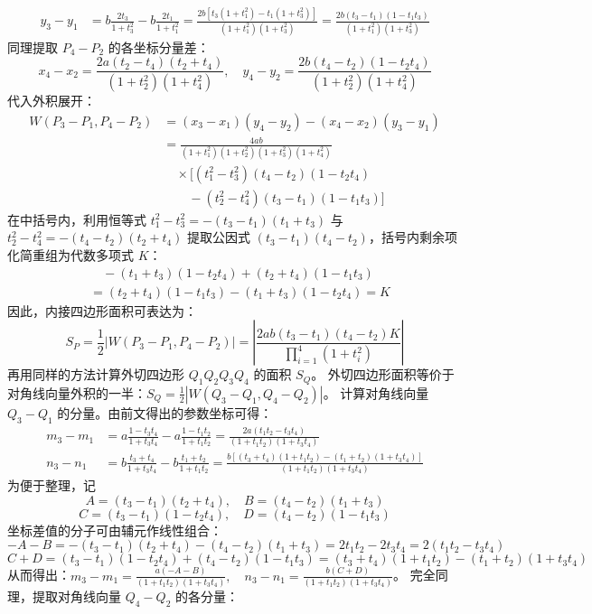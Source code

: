 \begin{solution}
\begin{align*}
y_3 - y_1 &= b\frac{2t_3}{1+t_3^2} - b\frac{2t_1}{1+t_1^2} = \frac{2b[t_3(1+t_1^2) - t_1(1+t_3^2)]}{(1+t_1^2)(1+t_3^2)} = \frac{2b(t_3-t_1)(1 - t_1 t_3)}{(1+t_1^2)(1+t_3^2)}
\end{align*}
同理提取 $P_4-P_2$ 的各坐标分量差：
\[ x_4 - x_2 = \frac{2a(t_2-t_4)(t_2+t_4)}{(1+t_2^2)(1+t_4^2)}, \quad y_4 - y_2 = \frac{2b(t_4-t_2)(1 - t_2 t_4)}{(1+t_2^2)(1+t_4^2)} \]
代入外积展开：
\begin{align*}
W(P_3-P_1, P_4-P_2) &= (x_3-x_1)(y_4-y_2) - (x_4-x_2)(y_3-y_1) \\
&= \frac{4ab}{(1+t_1^2)(1+t_2^2)(1+t_3^2)(1+t_4^2)} \\
&\quad \times \Big[ (t_1^2-t_3^2)(t_4-t_2)(1-t_2 t_4) \\
&\qquad - (t_2^2-t_4^2)(t_3-t_1)(1-t_1 t_3) \Big]
\end{align*}
在中括号内，利用恒等式 $t_1^2-t_3^2 = -(t_3-t_1)(t_1+t_3)$ 与 $t_2^2-t_4^2 = -(t_4-t_2)(t_2+t_4)$ 提取公因式 $(t_3-t_1)(t_4-t_2)$，括号内剩余项化简重组为代数多项式 $K$：
\begin{align*}
&\quad -(t_1+t_3)(1-t_2 t_4) + (t_2+t_4)(1-t_1 t_3) \\
&= (t_2 + t_4)(1 - t_1 t_3) - (t_1 + t_3)(1 - t_2 t_4) = K
\end{align*}
因此，内接四边形面积可表达为：
\[ S_P = \frac{1}{2} |W(P_3-P_1, P_4-P_2)| = \left| \frac{2ab (t_3-t_1)(t_4-t_2) K}{\prod_{i=1}^4 (1+t_i^2)} \right| \]
再用同样的方法计算外切四边形 $Q_1Q_2Q_3Q_4$ 的面积 $S_Q$。
外切四边形面积等价于对角线向量外积的一半：$S_Q = \frac{1}{2} |W(Q_3-Q_1, Q_4-Q_2)|$。
计算对角线向量 $Q_3 - Q_1$ 的分量。由前文得出的参数坐标可得：
\begin{align*}
m_3 - m_1 &= a \frac{1-t_3 t_4}{1+t_3 t_4} - a \frac{1-t_1 t_2}{1+t_1 t_2} = \frac{2a(t_1 t_2 - t_3 t_4)}{(1+t_1 t_2)(1+t_3 t_4)} \\
n_3 - n_1 &= b \frac{t_3+t_4}{1+t_3 t_4} - b \frac{t_1+t_2}{1+t_1 t_2} = \frac{b [ (t_3+t_4)(1+t_1 t_2) - (t_1+t_2)(1+t_3 t_4) ]}{(1+t_1 t_2)(1+t_3 t_4)}
\end{align*}
为便于整理，记
\[ A = (t_3-t_1)(t_2+t_4), \quad B = (t_4-t_2)(t_1+t_3) \]
\[ C = (t_3-t_1)(1-t_2 t_4), \quad D = (t_4-t_2)(1-t_1 t_3) \]
坐标差值的分子可由辅元作线性组合：
\[ -A-B = -(t_3-t_1)(t_2+t_4) - (t_4-t_2)(t_1+t_3) = 2t_1 t_2 - 2t_3 t_4 = 2(t_1 t_2 - t_3 t_4) \]
\[ C+D = (t_3-t_1)(1-t_2 t_4) + (t_4-t_2)(1-t_1 t_3) = (t_3+t_4)(1+t_1 t_2) - (t_1+t_2)(1+t_3 t_4) \]
从而得出：$m_3 - m_1 = \frac{a(-A-B)}{(1+t_1t_2)(1+t_3t_4)}, \quad n_3 - n_1 = \frac{b(C+D)}{(1+t_1t_2)(1+t_3t_4)}$。
完全同理，提取对角线向量 $Q_4 - Q_2$ 的各分量：

\end{solution}
